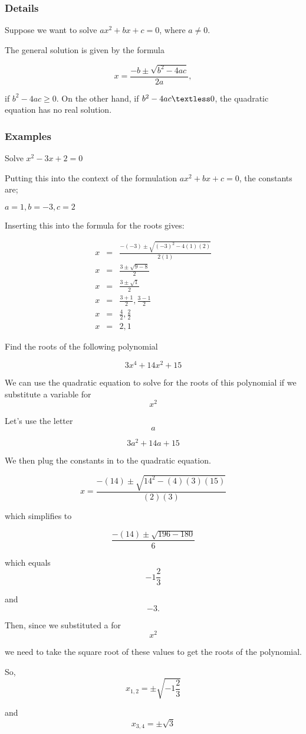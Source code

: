 \documentclass[12pt,a4paper]{article}
\theoremstyle{regla}
\theoremstyle{remark}
\theoremstyle{definition}
\theoremstyle{nonumberbreak}
\begin{document}
\subsubsection{Details}
Suppose we want to solve $ax^2 + bx + c = 0$, where 
$a \neq 0$.

The general solution is given by the formula

$$ x = \frac{-b \pm \sqrt{b^2 - 4ac}}{2a},$$

if  $b^2 - 4ac \geq 0$. On the other hand, if $b^2-4ac\textless 0$, the quadratic equation has no real solution.

\subsubsection{Examples}
\begin{xmpl}

Solve $x^2 - 3x + 2 = 0$

Putting this into the context of the formulation $ax^2+bx+c=0$, the constants are;

$a = 1, b = -3 , c = 2$

Inserting this into the formula for the roots gives:

\begin{eqnarray*}
x &=& \frac{-(-3) \pm \sqrt{(-3)^2 - 4(1)(2)}}{2(1)}\\
x &=& \frac{3 \pm \sqrt{9 - 8}}{2}\\
x &=& \frac{3 \pm \sqrt{1}}{2}\\
x &=& \frac{3 + 1}{2} , \frac{3 - 1}{2}\\
x &=& \frac{4}{2} , \frac{2}{2}\\
x &=& 2 , 1 
\end{eqnarray*}

\end{xmpl}
\begin{xmpl}


Find the roots of the following polynomial

$$3x^{4} + 14x^{2} + 15$$

We can use the quadratic equation to solve for the roots of this polynomial if we substitute a variable for $$x^{2}$$

Let's use the letter $$a$$

$$3a^{2} + 14a + 15$$

We then plug the constants in to the quadratic equation.

$$x = \frac{-(14) \pm \sqrt{14^{2} - (4)(3)(15)}}{(2)(3)}$$

which simplifies to

$$\frac{-(14) \pm \sqrt{196 - 180}}{6}$$

which equals $$-1\frac{2}{3}$$

and $$-3.$$

Then, since we substituted a for $$x^2$$

we need to take the square root of these values to get the roots of the polynomial.

So, $$x_{1,2} = \pm \sqrt{-1\frac{2}{3}}$$

and $$x_{3,4} = \pm \sqrt{3}$$
\end{xmpl}
\end{document}
